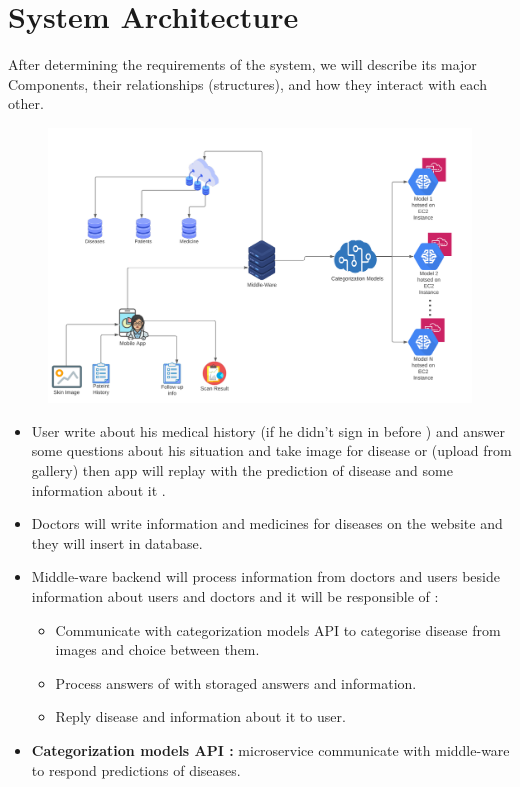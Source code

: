 \section{System Architecture}
After determining the requirements of the system, we will describe its major 
Components, their relationships (structures), and how they interact with each
other.
\begin{figure}[!ht]
\centering
\includegraphics[width = 6in]{backmatter/figures/sys.arch.png}
\end{figure}
\vspace{0.25cm}
\begin{itemize}
  \item User write about his medical history (if he didn’t sign in before ) and answer some questions about his situation and take image for disease or (upload from gallery) then app will replay with the prediction of disease and some information about it .\\
  \item Doctors will write information and medicines for diseases on the website and they will insert in database.\\
  \item Middle-ware backend will process information from doctors and users 
  beside information about users and doctors  and it will be responsible of 
  :\\
    \begin{itemize}
        \item Communicate with categorization models API to categorise disease from images and choice between them.\\
        \item Process answers of with storaged answers and information.\\
        \item Reply disease and information about it to user.\\
    \end{itemize}
  \item \textbf{Categorization models API :} microservice communicate with middle-ware to respond predictions of diseases.\\
\end{itemize}
